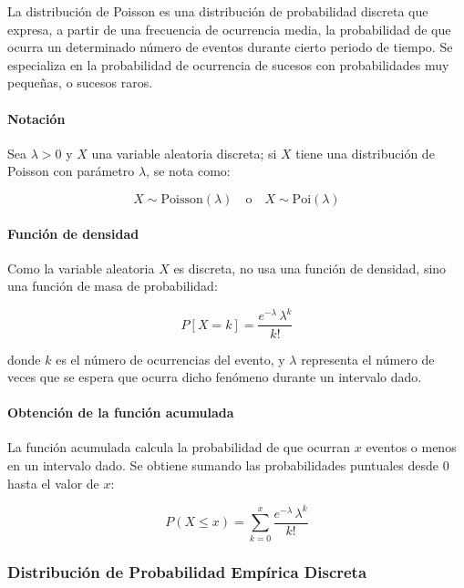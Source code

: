 \documentclass{article}
\begin{document}
La distribución de Poisson es una distribución de probabilidad discreta que expresa, a
partir de una frecuencia de ocurrencia media, la probabilidad de que ocurra un determinado
número de eventos durante cierto periodo de tiempo. Se especializa en la probabilidad de
ocurrencia de sucesos con probabilidades muy pequeñas, o sucesos raros.

\paragraph{Notación}

Sea $\lambda > 0$ y $X$ una variable aleatoria discreta; si $X$ tiene una distribución de Poisson
con parámetro $\lambda$, se nota como:

\begin{equation}
    X \sim \mathrm{Poisson}(\lambda) \quad \text{o} \quad X \sim \mathrm{Poi}(\lambda)
\end{equation}

\paragraph{Función de densidad}

Como la variable aleatoria $X$ es discreta, no usa una función de densidad, sino una función
de masa de probabilidad:

\begin{equation}
    P[X = k] = \frac{e^{-\lambda}\,\lambda^k}{k!}
\end{equation}

donde $k$ es el número de ocurrencias del evento, y $\lambda$ representa el número de veces
que se espera que ocurra dicho fenómeno durante un intervalo dado.

\paragraph{Obtención de la función acumulada}

La función acumulada calcula la probabilidad de que ocurran $x$ eventos o menos en un
intervalo dado. Se obtiene sumando las probabilidades puntuales desde 0 hasta el valor
de $x$:

\begin{equation}
    P(X \leq x) = \sum_{k=0}^{x} \frac{e^{-\lambda}\,\lambda^k}{k!}
\end{equation}


\subsubsection{Distribución de Probabilidad Empírica Discreta}
\end{document}
